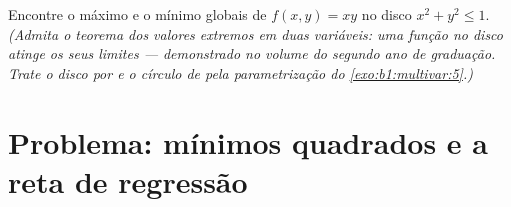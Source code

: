 \begin{exercise}[$\star\star\star$]\label{exo:b1:multivar:12}
Encontre o máximo e o mínimo globais de $f(x, y) = xy$ no disco  $x^2 + y^2 \leq 1$.
\emph{(Admita o teorema dos valores extremos em duas variáveis: uma
função  no disco  atinge os seus limites ---
demonstrado no volume do segundo ano de graduação. Trate o disco
 por  e o círculo de  pela
parametrização do \cref{exo:b1:multivar:5}.)}
\end{exercise}

\section{Problema: mínimos quadrados e a reta de regressão}

